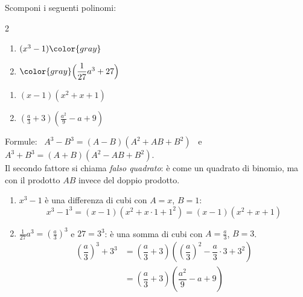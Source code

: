 \begin{question}[ID=3.1, subtitle={Scomposizione con differenza e somma di cubi}, tags={scomposizione, polinomi}, difficulty=facile]
Scomponi i seguenti polinomi:
\begin{center}\begin{minipage}{0.92\linewidth}
\begin{multicols}{2}
\begin{enumerate}[leftmargin=3.2cm]
\item $(x^3-1) \color{gray}$
\item $\color{gray} \Big( \dfrac{1}{27}a^3 + 27\Big)$
\end{enumerate}
\end{multicols}
\end{minipage}\end{center}
\begin{solution}
\begin{enumerate}
    \item $(x-1)(x^2+x+1)$
    \item $\left(\tfrac a3+3\right)\left(\tfrac{a^2}{9}-a+9\right)$
\end{enumerate}
\end{solution}
\begin{explanation}
Formule: \ $A^3-B^3=(A-B)(A^2+AB+B^2)$ \ e \ $A^3+B^3=(A+B)(A^2-AB+B^2)$. \\
Il secondo fattore si chiama \emph{falso quadrato}: è come un quadrato di binomio, ma con il prodotto $AB$ invece del doppio prodotto.
\begin{enumerate}
    \item $x^3-1$ è una differenza di cubi con $A=x$, $B=1$:
    \[ x^3-1^3=(x-1)(x^2+x\cdot1+1^2)=(x-1)(x^2+x+1) \]
    \item $\tfrac{1}{27}a^3=\left(\tfrac a3\right)^3$ e $27=3^3$: è una somma di cubi con $A=\tfrac a3$, $B=3$.
    \[\begin{aligned}
    \left(\dfrac a3\right)^3+3^3 &= \left(\dfrac a3+3\right)\left(\left(\dfrac a3\right)^2-\dfrac a3\cdot3+3^2\right)\\
    &= \left(\dfrac a3+3\right)\left(\dfrac{a^2}{9}-a+9\right)
    \end{aligned}\]
\end{enumerate}
\end{explanation}
\end{question}
